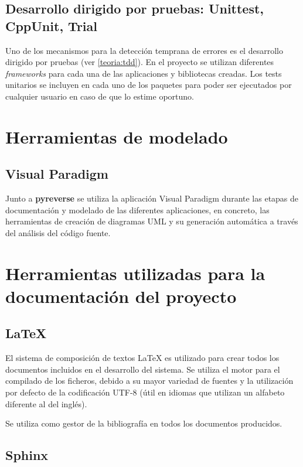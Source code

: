 \subsection{Desarrollo dirigido por pruebas: Unittest, CppUnit, Trial}

Uno de los mecanismos para la detección temprana de errores es el desarrollo dirigido por pruebas (ver \ref{teoria:tdd}). En el proyecto se utilizan diferentes \textit{frameworks} para cada una de las aplicaciones y bibliotecas creadas. Los tests unitarios se incluyen en cada uno de los paquetes para poder ser ejecutados por cualquier usuario en caso de que lo estime oportuno.

\section{Herramientas de modelado}
\subsection{Visual Paradigm}

Junto a \textbf{pyreverse} se utiliza la aplicación Visual Paradigm durante las etapas de documentación y modelado de las diferentes aplicaciones, en concreto, las herramientas de creación de diagramas UML y su generación automática a través del análisis del código fuente.

\section{Herramientas utilizadas para la documentación del proyecto}

\subsection{{\LaTeX}}

El sistema de composición de textos {\LaTeX} es utilizado para crear todos los documentos incluidos en el desarrollo del sistema. Se utiliza el motor {\XeLaTeX} para el compilado de los ficheros, debido a su mayor variedad de fuentes y la utilización por defecto de la codificación UTF-8 (útil en idiomas que utilizan un alfabeto diferente al del inglés). 

Se utiliza {\BibTeX} como gestor de la bibliografía en todos los documentos producidos.

\subsection{Sphinx}

